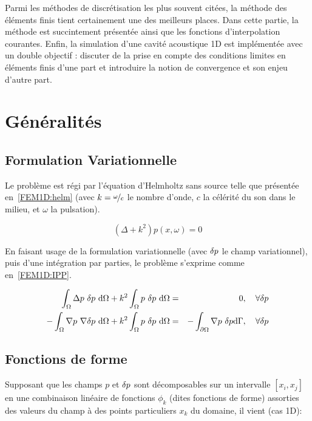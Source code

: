 Parmi les méthodes de discrétisation les plus souvent citées, la méthode des éléments finis tient certainement une
des meilleurs places. Dans cette partie, la méthode est succintement présentée ainsi que les fonctions d'interpolation
courantes. Enfin, la simulation d'une cavité acoustique 1D est implémentée avec un double objectif : discuter de la
prise en compte des conditions limites en éléments finis d'une part et introduire la notion de convergence et son
enjeu d'autre part.

\section{Généralités}
\label{FEM1D:subsection:linear}

\subsection{Formulation Variationnelle}

Le problème est régi par l'équation d'Helmholtz sans source telle que présentée en~\eqref{FEM1D:helm} (avec $k =
\nicefrac{\omega}{c}$ le nombre d'onde, $c$ la célérité du son dans le milieu, et $\omega$ la pulsation).

\begin{equation}
	(\Delta + k^2)p(x,\omega) = 0 \label{FEM1D:helm}
\end{equation}

En faisant usage de la formulation variationnelle (avec $\delta p$ le champ variationnel), puis d'une intégration par
parties, le problème s'exprime comme en~\eqref{FEM1D:IPP}.

\begin{eqnarray}
	\int_\Omega \Delta p~\delta p~\mathrm{d}\Omega + k^2 \int_\Omega p~\delta p~\mathrm{d}\Omega & =  & 0,\quad \forall\delta p\notag\\
	- \int_\Omega \nabla p~\nabla \delta p ~\mathrm{d}\Omega + k^2\int_\Omega p~\delta p~\mathrm{d}\Omega & = & -\int_{\partial\Omega}\nabla p~\delta p\mathrm{d}\Gamma, \quad \forall\delta p \label{FEM1D:IPP}
\end{eqnarray}

\subsection{Fonctions de forme}

Supposant que les champs $p$ et $\delta p$ sont décomposables sur un intervalle $[x_i, x_j]$ en une combinaison linéaire de
fonctions $\phi_k$ (dites fonctions de forme) assorties des valeurs du champ à des points particuliers $x_k$ du domaine, il
vient (cas 1D):

